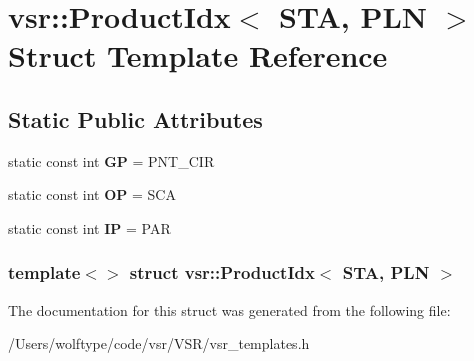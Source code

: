 \hypertarget{structvsr_1_1_product_idx_3_01_s_t_a_00_01_p_l_n_01_4}{\section{vsr\-:\-:Product\-Idx$<$ S\-T\-A, P\-L\-N $>$ Struct Template Reference}
\label{structvsr_1_1_product_idx_3_01_s_t_a_00_01_p_l_n_01_4}
}
\subsection*{Static Public Attributes}
\begin{DoxyCompactItemize}
\item 
\hypertarget{structvsr_1_1_product_idx_3_01_s_t_a_00_01_p_l_n_01_4_a0cc7b7dc9314a9ec0218798f67d9f495}{static const int {\bfseries G\-P} = P\-N\-T\-\_\-\-C\-I\-R}\label{structvsr_1_1_product_idx_3_01_s_t_a_00_01_p_l_n_01_4_a0cc7b7dc9314a9ec0218798f67d9f495}

\item 
\hypertarget{structvsr_1_1_product_idx_3_01_s_t_a_00_01_p_l_n_01_4_aff1a77ced6c2b5dc7a357e7d404830a4}{static const int {\bfseries O\-P} = S\-C\-A}\label{structvsr_1_1_product_idx_3_01_s_t_a_00_01_p_l_n_01_4_aff1a77ced6c2b5dc7a357e7d404830a4}

\item 
\hypertarget{structvsr_1_1_product_idx_3_01_s_t_a_00_01_p_l_n_01_4_af24c750470dcbbe045c142f07bead870}{static const int {\bfseries I\-P} = P\-A\-R}\label{structvsr_1_1_product_idx_3_01_s_t_a_00_01_p_l_n_01_4_af24c750470dcbbe045c142f07bead870}

\end{DoxyCompactItemize}
\subsubsection*{template$<$$>$ struct vsr\-::\-Product\-Idx$<$ S\-T\-A, P\-L\-N $>$}



The documentation for this struct was generated from the following file\-:\begin{DoxyCompactItemize}
\item 
/\-Users/wolftype/code/vsr/\-V\-S\-R/vsr\-\_\-templates.\-h\end{DoxyCompactItemize}

